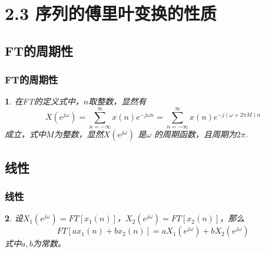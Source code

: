 \documentclass[notheorems,compress,mathserif,table]{beamer}
\newtheorem{dablock}{}
\begin{document}
\section{2.3 序列的傅里叶变换的性质}

\subsection*{FT的周期性}

\begin{frame}[shrink]\frametitle{FT的周期性}%
\begin{dablock}
在FT的定义式中，$n$取整数，显然有
\begin{equation*}
X(e^{j\omega}) = \sum_{n=-\infty}^{\infty}x(n)e^{-j\omega n} = \sum_{n=-\infty}^{\infty}x(n)e^{-j(\omega+2\pi M)n}
\end{equation*}
成立，式中$M$为整数，显然$X(e^{j\omega})$ 是$\omega$ 的周期函数，且周期为$2\pi$.

\end{dablock}

\end{frame}


\subsection*{线性}
\begin{frame}\frametitle{线性}%
\begin{dablock}
设$X_{1}(e^{j\omega})= FT[x_{1}(n)]$，$X_{2}(e^{j\omega})= FT[x_{2}(n)]$，那么
\begin{equation*}
FT[ax_{1}(n)+bx_{2}(n)] = aX_{1}(e^{j\omega}) + bX_{2}(e^{j\omega})
\end{equation*}
式中$a,b$为常数。
\end{dablock}
\end{frame}


%
\end{document}
